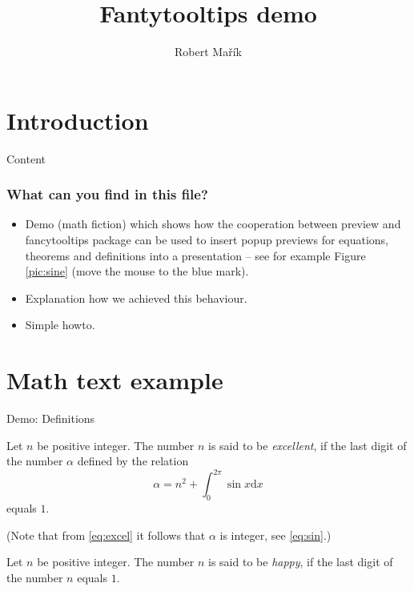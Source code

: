 \documentclass[envcountsect,t,10pt]{beamer}
\def\dx{{\mathrm d}x}
\begin{document}
\FancyHook

\title{Fantytooltips demo}
\author{Robert Ma\v{r}\'ik}

\maketitle
\section{Introduction}

\begin{frame}{Content}
  \tableofcontents
\end{frame}
\begin{frame}
  \frametitle{What can you find in this file?}
  \begin{itemize}
  \item Demo (math fiction) which shows how the cooperation between
    preview and fancytooltips package can be used to insert popup
    previews for equations, theorems and definitions into a
    presentation -- see for example Figure \ref{pic:sine} (move the
    mouse to the blue mark).
  \item Explanation how we achieved this behaviour.
  \item Simple howto.
  \end{itemize}
\end{frame}

\section{Math text example}

\begin{frame}{Demo: Definitions}
  \begin{definition}
    Let $n$ be positive integer. The number $n$ is said to be
    \textit{excellent}, if the last digit of the number $\alpha$
    defined by the relation
    \begin{equation}
      \label{eq:excel}
      \alpha = n^2 +\int_0^{2\pi}\sin x\dx
    \end{equation}
    equals $1$.\label{def:excellent-number}
  \end{definition}

  (Note that from \eqref{eq:excel} it follows that $\alpha$ is
  integer, see \ref{eq:sin}.)

\begin{definition}
  Let $n$ be positive integer. The number $n$ is said to be
  \textit{happy}, if the last digit of the number $n$ equals $1$.
  \label{def:happy-number}
\end{definition}
\end{frame}
\end{document}
